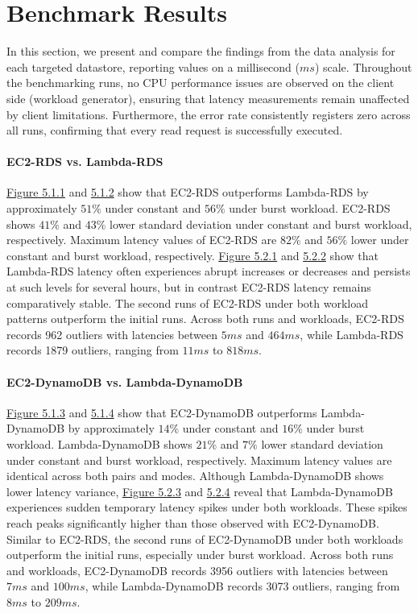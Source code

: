 \section{Benchmark Results}
\label{cha:results}

In this section, we present and compare the findings from the data analysis for each targeted datastore, reporting values on a millisecond ($ms$) scale. Throughout the benchmarking runs, no CPU performance issues are observed on the client side (workload generator), ensuring that latency measurements remain unaffected by client limitations. Furthermore, the error rate consistently registers zero across all runs, confirming that every read request is successfully executed.

\paragraph*{EC2-RDS vs. Lambda-RDS}
\hyperref[fig:bar_rds_const]{Figure 5.1.1} and \hyperref[fig:bar_rds_bursty]{5.1.2} show that EC2-RDS outperforms Lambda-RDS by approximately $51\%$ under constant and $56\%$ under burst workload. EC2-RDS shows $41\%$ and $43\%$ lower standard deviation under constant and burst workload, respectively. Maximum latency values of EC2-RDS are $82\%$ and $56\%$ lower under constant and burst workload, respectively.
%
\hyperref[fig:ts_rds_const]{Figure 5.2.1} and \hyperref[fig:ts_rds_bursty]{5.2.2} show that Lambda-RDS latency often experiences abrupt increases or decreases and persists at such levels for several hours, but in contrast EC2-RDS latency remains comparatively stable. The second runs of EC2-RDS under both workload patterns outperform the initial runs.
%
Across both runs and workloads, EC2-RDS records 962 outliers with latencies between $5ms$ and $464ms$, while Lambda-RDS records 1879 outliers, ranging from $11ms$ to $818ms$.


\paragraph*{EC2-DynamoDB vs. Lambda-DynamoDB}
\hyperref[fig:bar_ddb_const]{Figure 5.1.3} and \hyperref[fig:bar_ddb_bursty]{5.1.4} show that EC2-DynamoDB outperforms Lambda-DynamoDB by approximately $14\%$ under constant and $16\%$ under burst workload. Lambda-DynamoDB shows $21\%$ and $7\%$ lower standard deviation under constant and burst workload, respectively. Maximum latency values are identical across both pairs and modes.
%
Although Lambda-DynamoDB shows lower latency variance, \hyperref[fig:ts_ddb_const]{Figure 5.2.3} and \hyperref[fig:ts_ddb_bursty]{5.2.4} reveal that Lambda-DynamoDB experiences sudden temporary latency spikes under both workloads. These spikes reach peaks significantly higher than those observed with EC2-DynamoDB. Similar to EC2-RDS, the second runs of EC2-DynamoDB under both workloads outperform the initial runs, especially under burst workload.
%
Across both runs and workloads, EC2-DynamoDB records 3956 outliers with latencies between $7ms$ and $100ms$, while Lambda-DynamoDB records 3073 outliers, ranging from $8ms$ to $209ms$.


